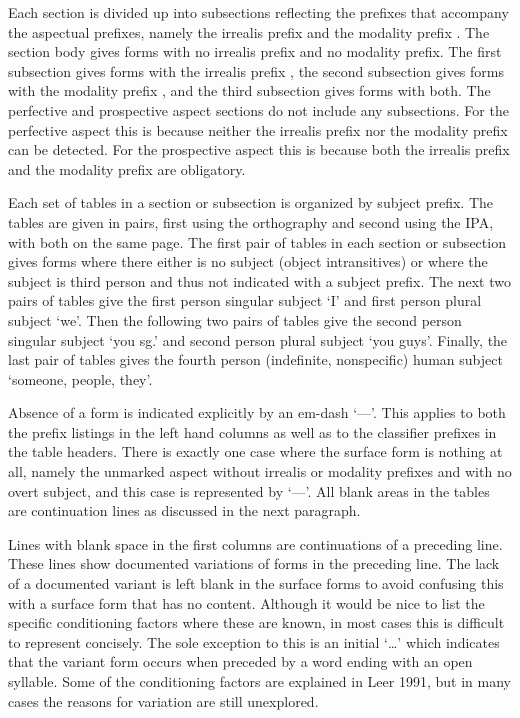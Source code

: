 \documentclass[12pt,letterpaper,landscape,oneside,article]{memoir}
\begin{document}
\begin{multicols}{2}
Each section is divided up into subsections reflecting the prefixes that accompany the aspectual prefixes, namely the irrealis prefix  and the modality prefix .
The section body gives forms with no irrealis prefix and no modality prefix.
The first subsection gives forms with the irrealis prefix , the second subsection gives forms with the modality prefix , and the third subsection gives forms with both.
The perfective and prospective aspect sections do not include any subsections.
For the perfective aspect this is because neither the irrealis prefix nor the modality prefix can be detected.
For the prospective aspect this is because both the irrealis prefix  and the modality prefix  are obligatory.

Each set of tables in a section or subsection is organized by subject prefix.
The tables are given in pairs, first using the orthography and second using the IPA, with both on the same page.
The first pair of tables in each section or subsection gives forms where there either is no subject (object intransitives) or where the subject is third person and thus not indicated with a subject prefix.
The next two pairs of tables give the first person singular subject  ‘I’ and first person plural subject  ‘we’.
Then the following two pairs of tables give the second person singular subject  ‘you sg.’ and second person plural subject  ‘you guys’.
Finally, the last pair of tables gives the fourth person (indefinite, nonspecific) human subject  ‘someone, people, they’.

Absence of a form is indicated explicitly by an em-dash ‘—’.
This applies to both the prefix listings in the left hand columns as well as to the classifier prefixes in the table headers.
There is exactly one case where the surface form is nothing at all, namely the unmarked aspect without irrealis or modality prefixes and with no overt subject, and this case is represented by ‘—’.
All blank areas in the tables are continuation lines as discussed in the next paragraph.

Lines with blank space in the first columns are continuations of a preceding line.
These lines show documented variations of forms in the preceding line.
The lack of a documented variant is left blank in the surface forms to avoid confusing this with a surface form that has no content.
Although it would be nice to list the specific conditioning factors where these are known, in most cases this is difficult to represent concisely.
The sole exception to this is an initial ‘…’ which indicates that the variant form occurs when preceded by a word ending with an open syllable.
Some of the conditioning factors are explained in Leer 1991, but in many cases the reasons for variation are still unexplored.


\end{multicols}
\end{document}
